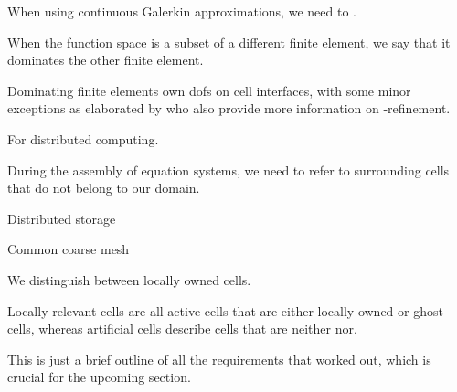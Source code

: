 When using continuous Galerkin approximations, we need to .

When the function space is a subset of a different finite element, we say that it dominates the other finite element.

Dominating finite elements own \glspl{dof} on cell interfaces, with some minor exceptions as elaborated by \textcite{bangerth2009} who also provide more information on \hp-refinement.

For distributed computing.

During the assembly of equation systems, we need to refer to surrounding cells that do not belong to our domain.

Distributed storage

Common coarse mesh

We distinguish between locally owned cells.

Locally relevant cells are all active cells that are either locally owned or ghost cells, whereas artificial cells describe cells that are neither nor.

This is just a brief outline of all the requirements that \textcite{bangerth2012} worked out, which is crucial for the upcoming section.